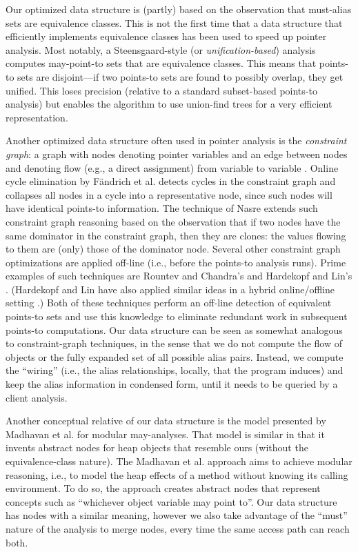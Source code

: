 Our optimized data structure is (partly) based on the observation that must-alias sets are equivalence classes. This is not the first time that a data structure that efficiently implements equivalence classes has been used to speed up pointer analysis. Most notably, a Steensgaard-style (or \emph{unification-based}) \cite{popl:1996:Steensgaard} analysis computes may-point-to sets that are equivalence classes. This means that points-to sets are disjoint---if two points-to sets are found to possibly overlap, they get unified. This loses precision (relative to a standard subset-based points-to analysis) but enables the algorithm to use union-find trees for a very efficient representation.

Another optimized data structure often used in pointer analysis is the \emph{constraint graph}: a graph with nodes denoting pointer variables and an edge between nodes  and  denoting flow (e.g., a direct assignment) from variable  to variable . Online cycle elimination by F\"{a}ndrich et al. \cite{pldi:1998:Fahndrich} detects cycles in the constraint graph and collapses all nodes in a cycle into a representative node, since such nodes will have identical points-to information. The technique of Nasre \cite{ismm:2012:Nasre} extends such constraint graph reasoning based on the observation that if two nodes have the same dominator in the constraint graph, then they are clones: the values flowing to them are (only) those of the dominator node. Several other constraint graph optimizations are applied off-line (i.e., before the points-to analysis runs). Prime examples of such techniques are Rountev and Chandra's \cite{pldi:2000:Rountev} and Hardekopf and Lin's \cite{sas:2007:Hardekopf}. (Hardekopf and Lin have also applied similar ideas in a hybrid online/offline setting \cite{pldi:2007:Hardekopf}.) Both of these techniques perform an off-line detection of equivalent points-to sets and use this knowledge to eliminate redundant work in subsequent points-to computations. Our data structure can be seen as somewhat analogous to constraint-graph techniques, in the sense that we do not compute the flow of objects or the fully expanded set of all possible alias pairs. Instead, we compute the ``wiring'' (i.e., the alias relationships, locally, that the program induces) and keep the alias information in condensed form, until it needs to be queried by a client analysis.

Another conceptual relative of our data structure is the model presented by Madhavan et al. \cite{article:2015:Madhavan} for modular may-analyses. That model is similar in that it invents abstract nodes for heap objects that resemble ours (without the equivalence-class nature). The Madhavan et al. approach aims to achieve modular reasoning, i.e., to model the heap effects of a method without knowing its calling environment. To do so, the approach creates abstract nodes that represent concepts such as ``whichever object variable  may point to''. Our data structure has nodes with a similar meaning, however we also take advantage of the ``must'' nature of the analysis to merge nodes, every time the same access path can reach both.



